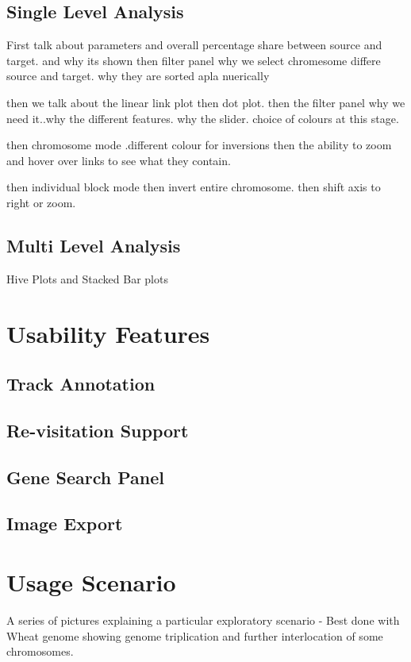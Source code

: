\subsection{Single Level Analysis}






First talk about parameters and overall percentage share between source and target. and why its shown
then filter panel why we select chromesome differe source and target. why they are sorted apla nuerically

then we talk about the linear link plot then dot plot.
then the filter panel why we need it..why the different features. why the slider. choice of colours at this stage.

then chromosome mode .different colour for inversions then the ability to zoom and hover over links to see what they contain.

then individual block mode then invert entire chromosome. then shift axis to right or zoom.



\subsection{Multi Level Analysis}
Hive Plots and Stacked Bar plots

\section{Usability Features}
\subsection{Track Annotation}
\subsection{Re-visitation Support}
\subsection{Gene Search Panel}
\subsection{Image Export}


\section{Usage Scenario}
A series of pictures explaining a particular exploratory scenario - Best done with Wheat genome showing genome triplication and further interlocation of some chromosomes.